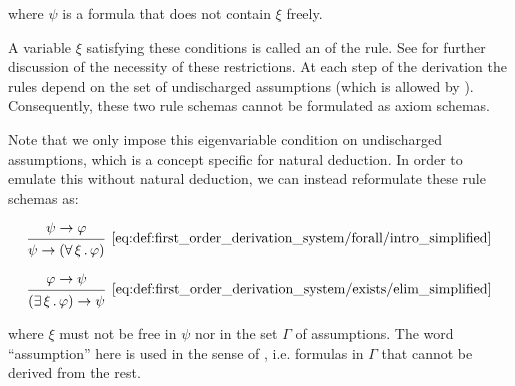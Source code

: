 \begin{definition}
\begin{thmenum}
    where \( \psi \) is a formula that does not contain \( \xi \) freely.

    A variable \( \xi \) satisfying these conditions is called an  of the rule. See  for further discussion of the necessity of these restrictions. At each step of the derivation the rules depend on the set of undischarged assumptions (which is allowed by ). Consequently, these two rule schemas cannot be formulated as axiom schemas.

     Note that we only impose this eigenvariable condition on undischarged assumptions, which is a concept specific for natural deduction. In order to emulate this without natural deduction, we can instead reformulate these rule schemas as:

    \begin{minipage}{0.45\textwidth}
      \begin{equation*}\taglabel[\textrm{R} \( \widetilde \forall^+ \)]{eq:def:first_order_derivation_system/forall/intro_simplified}
        \begin{prooftree}
          \hypo{ \psi \rightarrow \varphi }
          \infer1[\ref{eq:def:first_order_derivation_system/forall/intro_simplified}]{ \psi \rightarrow (\qforall \xi \varphi) }
        \end{prooftree}
      \end{equation*}
    \end{minipage}
    \hfill
    \begin{minipage}{0.45\textwidth}
      \begin{equation*}\taglabel[\textrm{R} \( \widetilde \exists^- \)]{eq:def:first_order_derivation_system/exists/elim_simplified}
        \begin{prooftree}
          \hypo{ \varphi \rightarrow \psi }
          \infer1[\ref{eq:def:first_order_derivation_system/exists/elim_simplified}]{ (\qexists \xi \varphi) \rightarrow \psi }
        \end{prooftree}
      \end{equation*}
    \end{minipage}

    where \( \xi \) must not be free in \( \psi \) nor in the set \( \Gamma \) of assumptions. The word \enquote{assumption} here is used in the sense of , i.e. formulas in \( \Gamma \) that cannot be derived from the rest.


\end{thmenum}
\end{definition}
